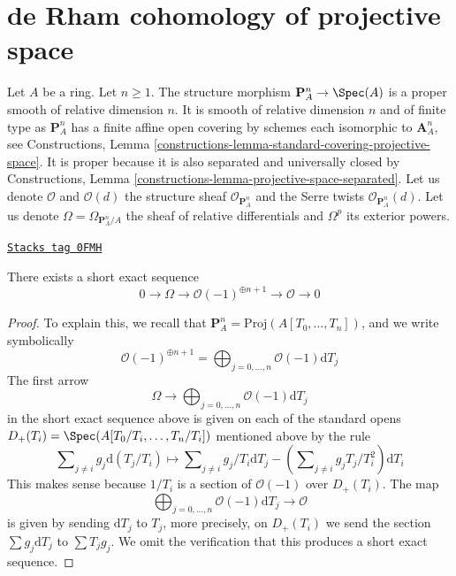 \section{de Rham cohomology of projective space}
\label{derham-section-projective-space}
Let $A$ be a ring. Let $n \geq 1$. The structure morphism
$\mathbf{P}^n_A \to \Spec(A)$ is a proper smooth of relative
dimension $n$. It is smooth of relative dimension $n$ and of finite type
as $\mathbf{P}^n_A$ has a finite affine open covering by schemes each
isomorphic to $\mathbf{A}^n_A$, see Constructions, Lemma
\ref{constructions-lemma-standard-covering-projective-space}.
It is proper because it is also separated and universally closed
by Constructions, Lemma \ref{constructions-lemma-projective-space-separated}.
Let us denote $\mathcal{O}$ and $\mathcal{O}(d)$ the structure sheaf
$\mathcal{O}_{\mathbf{P}^n_A}$ and the Serre twists
$\mathcal{O}_{\mathbf{P}^n_A}(d)$.
Let us denote $\Omega = \Omega_{\mathbf{P}^n_A/A}$ the sheaf
of relative differentials and $\Omega^p$ its exterior powers.

\begin{lemma}
\label{derham-lemma-euler-sequence}
\href{https://stacks.math.columbia.edu/tag/0FMH}{\texttt{Stacks tag 0FMH}}

There exists a short exact sequence
$$
0 \to \Omega \to \mathcal{O}(-1)^{\oplus n + 1} \to \mathcal{O} \to 0
$$
\end{lemma}

\begin{proof}
To explain this, we recall that
$\mathbf{P}^n_A = \text{Proj}(A[T_0, \ldots, T_n])$,
and we write symbolically
$$
\mathcal{O}(-1)^{\oplus n + 1} =
\bigoplus\nolimits_{j = 0, \ldots, n} \mathcal{O}(-1) \text{d}T_j
$$
The first arrow
$$
\Omega \to
\bigoplus\nolimits_{j = 0, \ldots, n} \mathcal{O}(-1) \text{d}T_j
$$
in the short exact sequence above
is given on each of the standard opens
$D_+(T_i) = \Spec(A[T_0/T_i, \ldots, T_n/T_i])$
mentioned above by the rule
$$
\sum\nolimits_{j \not = i} g_j \text{d}(T_j/T_i)
\longmapsto
\sum\nolimits_{j \not = i} g_j/T_i \text{d}T_j
- (\sum\nolimits_{j \not = i} g_jT_j/T_i^2) \text{d}T_i
$$
This makes sense because $1/T_i$ is a section of $\mathcal{O}(-1)$
over $D_+(T_i)$. The map
$$
\bigoplus\nolimits_{j = 0, \ldots, n} \mathcal{O}(-1) \text{d}T_j
\to
\mathcal{O}
$$
is given by sending $\text{d}T_j$ to $T_j$, more precisely, on
$D_+(T_i)$ we send the section $\sum g_j \text{d}T_j$ to
$\sum T_jg_j$. We omit the verification that this produces
a short exact sequence.
\end{proof}

